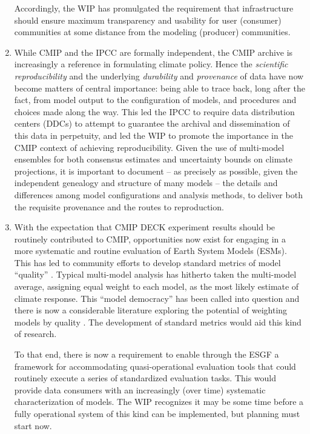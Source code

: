 \documentclass[gmd,manuscript]{copernicus}
\newcommand{\pllabel}[1]{\label{p-#1}\linelabel{l-#1}}
\begin{document}
\begin{enumerate}
  Accordingly, the WIP has promulgated the requirement that
  infrastructure should ensure maximum transparency and usability for
  user (consumer) communities at some distance from the modeling
  (producer) communities.
\item\label{repro} While CMIP and the IPCC are formally independent,
  the CMIP archive is increasingly a reference in formulating climate
  policy. Hence the \emph{scientific reproducibility}
  \citep{ref:collinstabak2014} and the underlying \emph{durability}
  and \emph{provenance} of data have now become matters of central
  importance: being able to trace
  \pllabel{RC2-15}
  back, long after the fact, from model output to the configuration of
  models, and procedures and choices made along the way. This led the
  IPCC to require data distribution centers (DDCs) to attempt to
  guarantee the archival and dissemination of this data in perpetuity,
  and led the WIP to promote the importance in the CMIP context of
  achieving reproducibility. Given the use of multi-model ensembles
  for both consensus estimates and uncertainty bounds on climate
  projections, it is important to document -- as precisely as
  possible, given the independent genealogy and structure of many
  models -- the details and differences among model configurations and
  analysis methods, to deliver both the requisite provenance and the
  routes to reproduction.
\item\label{analysis} With the expectation that CMIP DECK experiment
  results should be routinely contributed to CMIP, opportunities now
  exist for engaging in a more systematic and routine evaluation of
  Earth System Models (ESMs). This has led to community efforts to
  develop standard metrics of model ``quality''
  \citep{ref:eyringetal2016,ref:gleckleretal2016}.
  \pllabel{RC2-16}
  Typical multi-model analysis has hitherto taken the multi-model
  average, assigning equal weight to each model, as the most likely
  estimate of climate response. This ``model democracy''
  \citep{ref:knutti2010} has been called into question and there is
  now a considerable literature exploring the potential of weighting
  models by quality \citep{ref:knuttietal2017}. The development of
  standard metrics would aid this kind of research.

  To that end, there is now a requirement to enable through the ESGF a
  framework for accommodating quasi-operational evaluation tools that
  could routinely execute a series of standardized evaluation tasks.
  This would provide data consumers with an increasingly (over time)
  systematic characterization of models. The WIP recognizes it may be
  some time before a fully operational system of this kind can be
  implemented, but planning must start now.


\end{enumerate}
\end{document}
